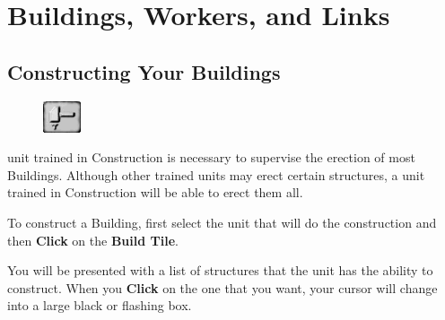 
\chapter{Buildings, Workers, and Links}

\section{Constructing Your Buildings}


\begin{figure}
	\vspace{-20pt}
	\begin{center}
		\includegraphics[width=0.1\textwidth]{Thammer}
	\end{center}
	\vspace{-20pt}
\end{figure}

 unit trained in Construction is necessary to supervise the erection of most Buildings. Although other trained units may erect certain structures, a unit trained in Construction will be able to erect them all.

To construct a Building, first select the unit that will do the construction and then \textbf{Click} on the \textbf{Build Tile}.

You will be presented with a list of structures that the unit has the ability to construct. When you \textbf{Click} on the one that you want, your cursor will change into a large black or flashing box.

